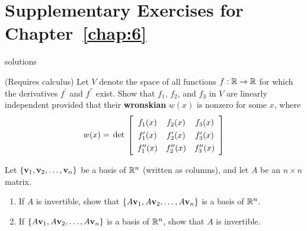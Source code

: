 \section*{Supplementary Exercises for Chapter~\ref{chap:6}}

\begin{Filesave}{solutions}
\end{Filesave}

\begin{multicols}{2}
\begin{supex}
(Requires calculus) Let $V$ denote the space of all functions $f : \mathbb{R} \to \mathbb{R}$ for which the derivatives $f^\prime$ and $f^\dprime$ exist. Show that $f_{1}$, $f_{2}$, and $f_{3}$ in $V$ are linearly independent provided that their \textbf{wronskian} $w(x)$ is nonzero for some $x$, where
\begin{equation*}
w(x) = \func{det}
\def\arraystretch{1.3}
\leftB \begin{array}{ccc}
f_1(x) & f_2(x) & f_3(x) \\
f_1^\prime(x) & f_2^\prime(x) & f_3^\prime(x) \\
f_1^\dprime(x) & f_2^\dprime(x) & f_3^\dprime(x) \\
\end{array} \rightB
\end{equation*}
\end{supex}

\begin{supex}
Let $\{\textbf{v}_{1}, \textbf{v}_{2}, \dots, \textbf{v}_{n}\}$ be a basis of $\mathbb{R}^n$ (written as columns), and let $A$ be an $n \times n$ matrix.

\begin{enumerate}[label={\alph*.}]
\item If $A$ is invertible, show that $\{A\textbf{v}_{1}, A\textbf{v}_{2}, \dots, A\textbf{v}_{n}\}$ is a basis of $\mathbb{R}^n$.

\item If $\{A\textbf{v}_{1}, A\textbf{v}_{2}, \dots, A\textbf{v}_{n}\}$ is a basis of $\mathbb{R}^n$, show that $A$ is invertible.


\end{enumerate}
\end{supex}
\end{multicols}
